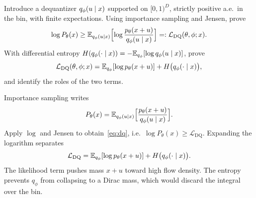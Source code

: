 \begin{hwqbox}
Introduce a dequantizer $q_\phi(u\mid x)$ supported on $[0,1)^D$, strictly positive a.e.\ in the bin, with finite expectations. Using importance sampling and Jensen, prove
\[
\log P_\theta(x)
\ge
\mathbb{E}_{q_\phi(u\mid x)}\Bigl[\log\frac{p_\theta(x+u)}{q_\phi(u\mid x)}\Bigr]
=:\mathcal L_{\mathrm{DQ}}(\theta,\phi;x).
\]
With differential entropy $H(q_\phi(\cdot\mid x))=-\mathbb{E}_{q_\phi}[\log q_\phi(u\mid x)]$, prove
\[
\mathcal L_{\mathrm{DQ}}(\theta,\phi;x)
=\mathbb{E}_{q_\phi}[\log p_\theta(x+u)]+H\bigl(q_\phi(\cdot\mid x)\bigr),
\]
and identify the roles of the two terms.
\end{hwqbox}
\begin{hwsolbox}
Importance sampling writes
\[
P_\theta(x)
=\mathbb{E}_{q_\phi(u\mid x)}\Bigl[\frac{p_\theta(x+u)}{q_\phi(u\mid x)}\Bigr].
\]
Apply $\log$ and Jensen to obtain~\eqref{eq:dq}, i.e.\ $\log P_\theta(x)\ge\mathcal L_{\mathrm{DQ}}$. Expanding the logarithm separates
\[
\mathcal L_{\mathrm{DQ}}
=\mathbb{E}_{q_\phi}[\log p_\theta(x+u)]+H\bigl(q_\phi(\cdot\mid x)\bigr).
\]
The likelihood term pushes mass $x+u$ toward high flow density. The entropy prevents $q_\phi$ from collapsing to a Dirac mass, which would discard the integral over the bin.
\end{hwsolbox}

